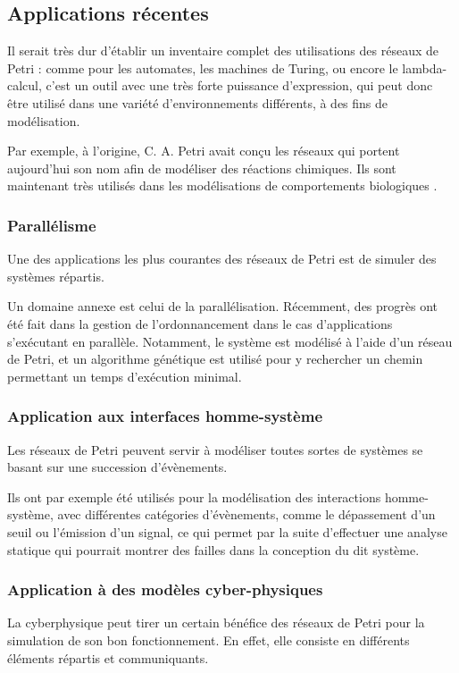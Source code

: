 \subsection{Applications récentes}
Il serait très dur d'établir un inventaire complet des utilisations des réseaux de Petri : comme pour les automates, les machines de Turing, ou encore le lambda-calcul, c'est un outil avec une très forte puissance d'expression, qui peut donc être utilisé dans une variété d'environnements différents, à des fins de modélisation.

Par exemple, à l'origine, C. A. Petri avait conçu les réseaux qui portent aujourd'hui son nom afin de modéliser des réactions chimiques. Ils sont maintenant très utilisés dans les modélisations de comportements biologiques \cite{koch2014petri}.

\subsubsection{Parallélisme}
Une des applications les plus courantes des réseaux de Petri est de simuler des systèmes répartis.

Un domaine annexe est celui de la parallélisation. Récemment, des progrès ont été fait dans la gestion de l'ordonnancement dans le cas d'applications s'exécutant en parallèle\cite{chen2014research}. Notamment, le système est modélisé à l'aide d'un réseau de Petri, et un algorithme génétique est utilisé pour y rechercher un chemin permettant un temps d'exécution minimal. 

\subsubsection{Application aux interfaces homme-système}
Les réseaux de Petri peuvent servir à modéliser toutes sortes de systèmes se basant sur une succession d'évènements.
 
Ils ont par exemple été utilisés pour la modélisation des interactions homme-système\cite{campos2014elementary}, avec différentes catégories d'évènements, comme le dépassement d'un seuil ou l'émission d'un signal, ce qui permet par la suite d'effectuer une analyse statique qui pourrait montrer des failles dans la conception du dit système.

\subsubsection{Application à des modèles cyber-physiques}
La \gls{cyberphysique} peut tirer un certain bénéfice des réseaux de Petri pour la simulation de son bon fonctionnement. En effet, elle consiste en différents éléments répartis et communiquants.

